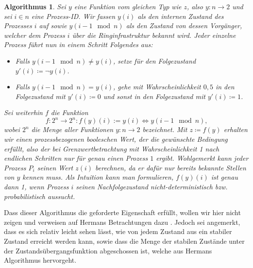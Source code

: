 \documentclass[a4paper]{article}
\newtheorem{algorithmus}[satz]{Algorithmus}
\theoremstyle{nonumberplain}
\begin{document}
\begin{algorithmus}\label{alg-herman}
	Sei $y$ eine Funktion vom gleichen Typ wie $z$, also $y : n \to 2$ und sei $i \in n$ eine Prozess-ID. Wir fassen $y(i)$ als den internen Zustand des Prozesses $i$ auf sowie $y(i - 1 \mod n)$ als den Zustand von dessen Vorgänger, welcher dem Prozess $i$ über die Ringinfrastruktur bekannt wird. Jeder einzelne Prozess führt nun in einem Schritt Folgendes aus:
	\begin{itemize}
		\item Falls $y(i-1 \mod n) \neq y(i)$, setze für den Folgezustand $y'(i) \coloneqq \neg y(i)$.
		\item Falls $y(i-1 \mod n) =    y(i)$, gehe mit Wahrscheinlichkeit $0,5$ in den Folgezustand mit $y'(i) \coloneqq 0$ und sonst in den Folgezustand mit $y'(i) \coloneqq 1$.
	\end{itemize}
	Sei weiterhin $f$ die Funktion
	\[
	f : 2^n \to 2^n : f(y)(i) :=  y(i) \Leftrightarrow y(i-1 \mod n)\text{,}
	\]
	wobei $2^n$ die Menge aller Funktionen $y : n\to2$ bezeichnet.
	Mit $z \coloneqq f(y)$ erhalten wir einen prozessbezogenen booleschen Wert, der die gewünschte Bedingung erfüllt, also der bei Grenzwertbetrachtung mit Wahrscheinlichkeit 1 nach endlichen Schritten nur für genau einen Prozess $1$ ergibt. Wohlgemerkt kann jeder Prozess $P_i$ seinen Wert $z(i)$ berechnen, da er dafür nur bereits bekannte Stellen von $y$ kennen muss. Als Intuition kann man formulieren, $f(y)(i)$ ist genau dann 1, wenn Prozess $i$ seinen Nachfolgezustand nicht-deterministisch bzw. probabilistisch aussucht.
\end{algorithmus}

Dass dieser Algorithmus die geforderte Eigenschaft erfüllt, wollen wir hier nicht zeigen und verweisen auf Hermans Betrachtungen dazu \cite{Her90}. Jedoch sei angemerkt, dass es sich relativ leicht sehen lässt, wie von jedem Zustand aus ein stabiler Zustand erreicht werden kann, sowie dass die Menge der stabilen Zustände unter der Zustandsübergangsfunktion abgeschossen ist, welche aus Hermans Algorithmus hervorgeht.
\end{document}
